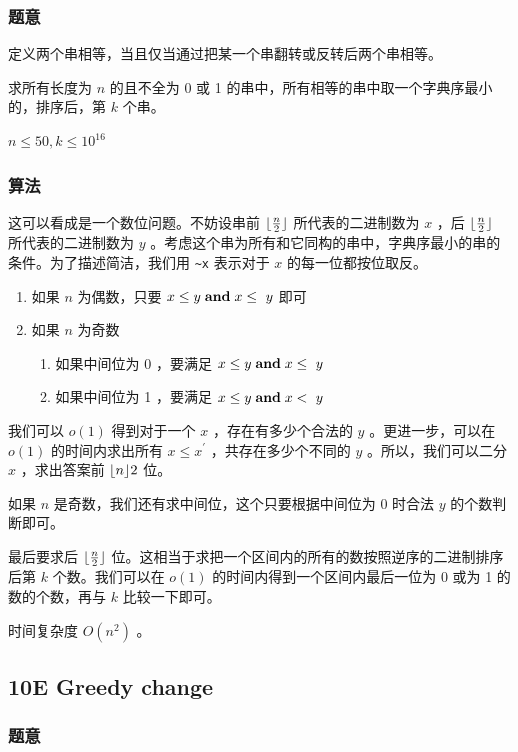 \documentclass[11pt]{article}
\begin{document}
\subsubsection{题意}
\label{sec-1-3-1}

    定义两个串相等，当且仅当通过把某一个串翻转或反转后两个串相等。

    求所有长度为 $n$ 的且不全为 0 或 1 的串中，所有相等的串中取一个字典序最小的，排序后，第 $k$ 个串。

    $n \leq 50, k \leq 10^{16}$
\subsubsection{算法}
\label{sec-1-3-2}

    这可以看成是一个数位问题。不妨设串前 ${\lfloor \frac{n}{2} \rfloor}$ 所代表的二进制数为 $x$ ，后 ${\lfloor \frac{n}{2} \rfloor}$ 所代表的二进制数为 $y$ 。考虑这个串为所有和它同构的串中，字典序最小的串的条件。为了描述简洁，我们用 \texttt{\textasciitilde{}x} 表示对于 $x$ 的每一位都按位取反。
\begin{enumerate}
\item 如果 $n$ 为偶数，只要 $x \leq y \hspace{0.1cm} \textbf{and} \hspace{0.1cm} x \leq ~y$ 即可
\item 如果 $n$ 为奇数
\begin{enumerate}
\item 如果中间位为 0 ，要满足 $x \leq y \hspace{0.1cm} \textbf{and} \hspace{0.1cm} x \leq ~y$
\item 如果中间位为 1 ，要满足 $x \leq y \hspace{0.1cm} \textbf{and} \hspace{0.1cm} x < ~y$
\end{enumerate}
\end{enumerate}

    我们可以 $o(1)$ 得到对于一个 $x$ ，存在有多少个合法的 $y$ 。更进一步，可以在 $o(1)$ 的时间内求出所有 $x \leq x^{\prime}$ ，共存在多少个不同的 $y$ 。所以，我们可以二分 $x$ ，求出答案前 ${\lfloor n \rfloor}{2}$ 位。

    如果 $n$ 是奇数，我们还有求中间位，这个只要根据中间位为 0 时合法 $y$ 的个数判断即可。

    最后要求后 ${\lfloor \frac{n}{2} \rfloor}$ 位。这相当于求把一个区间内的所有的数按照逆序的二进制排序后第 $k$ 个数。我们可以在 $o(1)$ 的时间内得到一个区间内最后一位为 0 或为 1 的数的个数，再与 $k$ 比较一下即可。

    时间复杂度 $O(n^2)$ 。
\subsection{10E   Greedy change}
\label{sec-1-4}
\subsubsection{题意}
\label{sec-1-4-1}
\end{document}
